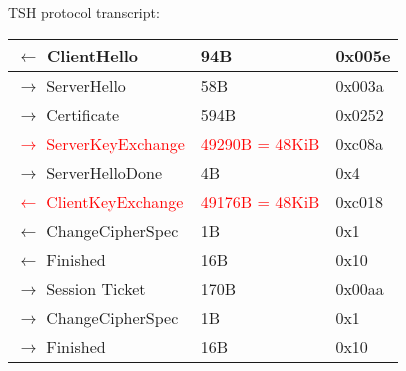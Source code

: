 \documentclass[12pt]{article}
\begin{document}
TSH protocol transcript:
\begin{center}
    \begin{tabular}{| l | l | l |}
    \hline
    $\leftarrow$ ClientHello & 94B & 0x005e\\ \hline
    $\rightarrow$ ServerHello & 58B & 0x003a\\ \hline
    $\rightarrow$ Certificate & 594B & 0x0252\\ \hline
    \textcolor{red}{$\rightarrow$ ServerKeyExchange} & \textcolor{red}{49290B = 48KiB} & 0xc08a\\ \hline
    $\rightarrow$ ServerHelloDone & 4B & 0x4\\ \hline
    \textcolor{red}{$\leftarrow$ ClientKeyExchange} & \textcolor{red}{49176B = 48KiB} & 0xc018\\ \hline
    $\leftarrow$ ChangeCipherSpec & 1B & 0x1\\ \hline
    $\leftarrow$ Finished & 16B & 0x10\\ \hline
    $\rightarrow$ Session Ticket & 170B & 0x00aa\\ \hline
    $\rightarrow$ ChangeCipherSpec & 1B & 0x1\\ \hline
    $\rightarrow$ Finished & 16B & 0x10\\ \hline
    \end{tabular}
\end{center}
\end{document}
